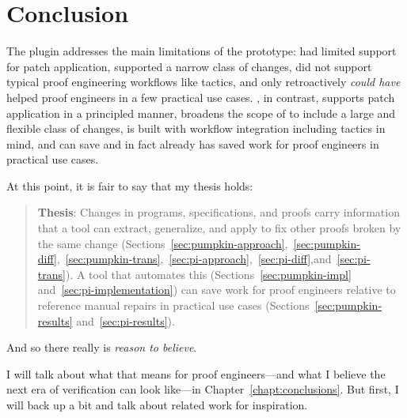 \section{Conclusion}
\label{sec:pi-concl}

The \toolnamec plugin addresses the main limitations of the \sysname prototype:
\sysname had limited support for patch application,
supported a narrow class of changes,
did not support typical proof engineering workflows like tactics,
and only retroactively \textit{could have} helped proof engineers in a few practical use cases.
\toolnamec, in contrast, supports patch application in a principled manner,
broadens the scope of \sysnamelong to include a large and flexible class of changes,
is built with workflow integration including tactics in mind,
and can save and in fact already has saved work for proof engineers in practical use cases.

At this point, it is fair to say that my thesis holds:

\begin{quote}
\textbf{Thesis}: Changes in programs, specifications, and proofs carry information that a tool can extract, generalize, and apply to fix other proofs broken by the same change (Sections~\ref{sec:pumpkin-approach},~\ref{sec:pumpkin-diff},~\ref{sec:pumpkin-trans},~\ref{sec:pi-approach},~\ref{sec:pi-diff},and~\ref{sec:pi-trans}). A tool that automates this (Sections~\ref{sec:pumpkin-impl} and~\ref{sec:pi-implementation}) can save work for proof engineers relative to reference manual repairs in 
practical use cases (Sections~\ref{sec:pumpkin-results} and~\ref{sec:pi-results}).
\end{quote}
And so there really is \textit{reason to believe}. %

I will talk about what that means for proof engineers---and what I believe the next era of verification can look like---in Chapter~\ref{chapt:conclusions}.
But first, I will back up a bit and talk about related work for inspiration.
